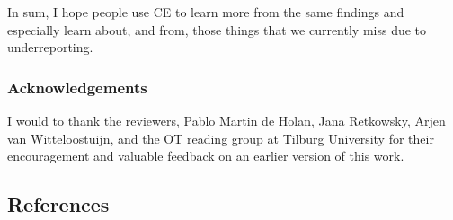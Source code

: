 \documentclass[empirical, authordate, meta]{jote-new-article}
\begin{document}
In sum, I hope people use CE to learn more from the same findings and especially learn about, and from, those things that we currently miss due to underreporting. 



\subsubsection{Acknowledgements}

I would to thank the reviewers, Pablo Martin de Holan, Jana Retkowsky, Arjen van Witteloostuijn, and the OT reading group at Tilburg University for their encouragement and valuable feedback on an earlier version of this work.



\subsection{References}
\end{document}
